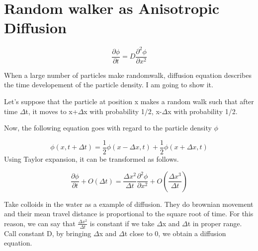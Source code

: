 \documentclass[12pt,a4paper]{scrartcl}
\begin{document}
\section{Random walker as Anisotropic Diffusion}
\[
\frac{\partial \phi}{\partial t} = D \frac{\partial^{2} \phi}{\partial x^{2}}
\]

When a large number of particles make randomwalk, diffusion equation describes the time developement of the particle density. I am going to show it.

Let's suppose that the particle at position x makes a random walk such that after time \(\Delta\)t, it moves to x+\(\Delta\)x with probability 1/2, x-\(\Delta\)x with probability 1/2.

Now, the following equation goes with regard to the particle density \(\phi\)

\[
\phi (x,t+\Delta t) = \frac{1}{2}\phi (x-\Delta x,t) + \frac{1}{2}\phi (x+\Delta x,t)
\]
Using Taylor expansion, it can be transformed as follows.

\[
\frac{\partial \phi}{\partial t} + O(\Delta t) = \frac{\Delta x^{2}}{\Delta t} \frac{\partial^{2} \phi}{\partial x^{2}} + O(\frac{\Delta x^{3}}{\Delta t})
\]

Take colloids in the water as a example of diffusion. They do brownian movement and their mean travel distance is proportional to the square root of time. For this reason, we can say that \(\frac{\Delta x^{2}}{\Delta t}\) is constant if we take \(\Delta\)x and \(\Delta\)t in proper range. Call constant D, by bringing \(\Delta\)x and \(\Delta\)t close to 0, we obtain a diffusion equation.
\end{document}
